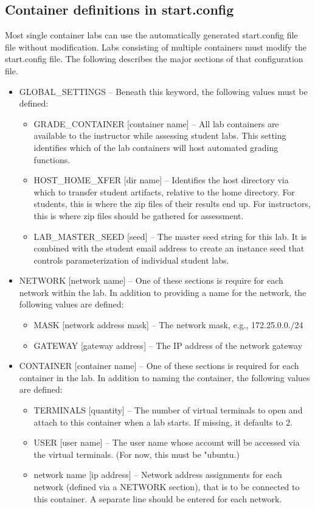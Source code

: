 \documentclass{article}
\begin{document}
\subsection{Container definitions in start.config}
Most single container labs can use the automatically generated start.config file file
without modification.  Labs consisting of multiple containers must modify the start.config 
file.  The following describes the major sections of that configuration file.
\begin{itemize}
\item GLOBAL\_SETTINGS -- Beneath this keyword, the following values must be defined:

\begin{itemize}
\item GRADE\_CONTAINER [container name] -- All lab containers are available to the instructor while assessing student labs.
This setting identifies which of the lab containers will host automated grading functions.
\item HOST\_HOME\_XFER [dir name] --  Identifies the host directory via which to transfer student artifacts, relative to 
the home directory.  For students, this is where the zip files of their results end up.  For instructors, this is
where zip files should be gathered for assessment.
\item LAB\_MASTER\_SEED [seed] -- The master seed string for this lab.  It is combined with the student email
address to create an instance seed that controls parameterization of individual student labs.
\end{itemize}

\item NETWORK [network name] -- One of these sections is require for each network within the lab.  In addition to
providing a name for the network, the following values are defined:

\begin{itemize}
\item MASK [network address mask] -- The network mask, e.g., 172.25.0.0./24
\item GATEWAY [gateway address] -- The IP address of the network gateway
\end{itemize}

\item CONTAINER [container name] -- One of these sections is required for each container in the lab.
In addition to naming the container, the following values are defined: 

\begin{itemize}
\item TERMINALS [quantity] -- The number of virtual terminals to open and attach to this container when a lab starts.
If missing, it defaults to 2.
\item USER [user name] -- The user name whose account will be accessed via the virtual terminals. (For now, this must be "ubuntu.)
\item network name [ip address] -- Network address assignments for each network (defined via a NETWORK section), 
that is to be connected to this container.  A separate line should be entered for each network.
\end{itemize}
\end{itemize}
  
\end{document}
